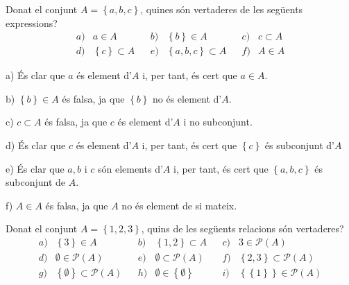 \begin{exercici}
Donat el conjunt $A=\left\{ a,b,c\right\} $, quines són vertaderes de
les següents expressions?%
\begin{equation*}
\begin{array}{cccccccc}
a) & a\in A &  & b) & \left\{ b\right\} \in A &  & c) & c\subset A \\
d) & \left\{ c\right\} \subset A &  & e) & \left\{ a,b,c\right\} \subset A &
& f) & A\in A%
\end{array}%
\end{equation*}
\end{exercici}

\begin{solucio}
a) És clar que $a$ és element d'$A$ i, per tant, és cert que $%
a\in A$.

b) $\left\{ b\right\} \in A$ és falsa, ja que $\left\{ b\right\} $ no
és element d'$A$.

c) $c\subset A$ és falsa, ja que $c$ és element d'$A$ i no
subconjunt.

d) És clar que $c$ és element d'$A$ i, per tant, és cert que $%
\left\{ c\right\} $ és subconjunt d'$A$

e) És clar que $a,b$ i $c$ són elements d'$A$ i, per tant, és
cert que $\left\{ a,b,c\right\} $ és subconjunt de $A$.

f) $A\in A$ és falsa, ja que $A$ no és element de si mateix.
\end{solucio}

\begin{exercici}
Donat el conjunt $A=\left\{ 1,2,3\right\} $, quins de les següents
relacions són vertaderes?%
\begin{equation*}
\begin{array}{llllllll}
a) & \left\{ 3\right\} \in A &  & b) & \left\{ 1,2\right\} \subset A &  & c)
& 3\in \mathcal{P}(A) \\
d) & \emptyset \in \mathcal{P}(A) &  & e) & \emptyset \subset \mathcal{P}(A)
&  & f) & \left\{ 2,3\right\} \subset \mathcal{P}(A) \\
g) & \left\{ \emptyset \right\} \subset \mathcal{P}(A) &  & h) & \emptyset
\in \left\{ \emptyset \right\} &  & i) & \left\{ \left\{ 1\right\} \right\}
\in \mathcal{P}(A)%
\end{array}%
\end{equation*}
\end{exercici}

